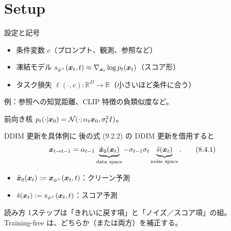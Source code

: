\section{Setup}
\asmain
\begin{frame}{設定と記号}
    \begin{itemize}
        \item 条件変数 $c$（プロンプト、観測、参照など）
        \item 凍結モデル $s_{\phi^\times}(\bm{x}_t,t)\approx\nabla_{\bm{x}_t}\log p_t(\bm{x}_t)$（スコア形）
        \item タスク損失 $\ell(\cdot,c):\mathbb{R}^{D}\to\mathbb{R}$（小さいほど条件に合う）
    \end{itemize}
    例：参照への知覚距離、CLIP 特徴の負類似度など。
    \begin{block}{前向き核}
        $p_t(\cdot|\bm{x}_0)=\mathcal{N}(\cdot;\alpha_t\bm{x}_0,\sigma_t^{2}I)$。
    \end{block}
\end{frame}
\asmain
\begin{frame}{DDIM 更新を具体例に}
    後の式 (9.2.2) の DDIM 更新を借用すると
    \[
        \bm{x}_{t\to t-1}
        =
        \alpha_{t-1}\underbrace{\hat{\bm{x}}_0(\bm{x}_t)}_{\text{data space}}
        -\sigma_{t-1}\sigma_t\underbrace{\hat{s}(\bm{x}_t)}_{\text{noise space}}.
        \tag{8.4.1}
    \]
    \begin{itemize}
        \item $\hat{\bm{x}}_0(\bm{x}_t):=\bm{x}_{\phi^\times}(\bm{x}_t,t)$：クリーン予測
        \item $\hat{s}(\bm{x}_t):=s_{\phi^\times}(\bm{x}_t,t)$：スコア予測
    \end{itemize}
    \begin{exampleblock}{読み方}
        1ステップは「きれいに戻す項」と「ノイズ／スコア項」の組。\\
        Training-free は、どちらか（または両方）を補正する。
    \end{exampleblock}
\end{frame}
\asmain
